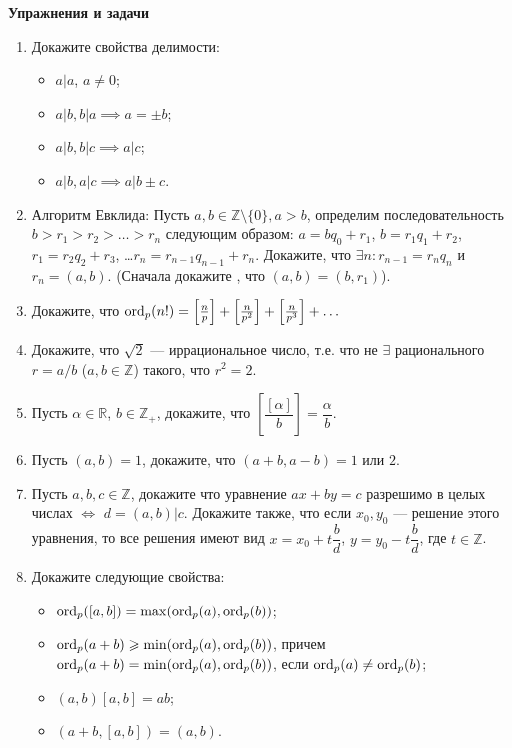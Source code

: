 \noindent\textbf{Упражнения и задачи}

\begin{enumerate}[topsep=0pt]
    \item Докажите свойства делимости: 
    \begin{itemize}[noitemsep,topsep=0pt]
        \item $a | a$, $a \neq 0$;
        \item $a|b, b|a \implies a=\pm b$;
        \item $a|b, b|c \implies a|c$;
        \item $a|b, a|c \implies a| b\pm c$.
    \end{itemize}
    \item Алгоритм Евклида: Пусть $a,b \in\mathbb{Z} \setminus \{0\}, a>b$, определим последовательность $b>r_1>r_2>\dots > r_n$ следующим образом: $a=bq_0+r_1$, $b=r_1q_1+r_2$, $r_1=r_2q_2+r_3$, \dots $r_n=r_{n-1} q_{n-1}+r_n$. Докажите, что $\exists n: r_{n-1}=r_nq_n$ и $r_n=(a,b)$. (Сначала докажите , что $(a,b)=(b,r_1)$).
    \item Докажите, что $\operatorname{ord}_p(n!)= \left[\frac{n}{p}\right] + \left[\frac{n}{p^2}\right] + \left[\frac{n}{p^3}\right] + \dots $
    \item Докажите, что $\sqrt{2}$ --- иррациональное число, т.е. что не $\exists$ рационального $r=a/b$ ($a,b \in \mathbb{Z}$) такого, что $r^2=2$.
    \item Пусть $\alpha \in \mathbb{R}$, $b\in\mathbb{Z}_+$, докажите, что $\left[\dfrac{[\alpha]}{b}\right]=\dfrac{\alpha}{b}$.
    \item Пусть $(a,b)=1$, докажите, что $(a+b,a-b)=1$ или $2$.
    \item Пусть $a,b,c \in \mathbb{Z}$, докажите что уравнение $ax+by=c$ разрешимо в целых числах $\iff$ $d=(a,b)|c$. Докажите также, что если $x_0,y_0$ --- решение этого уравнения, то все решения имеют вид $x=x_0+t\dfrac{b}{d}$, $y=y_0-t\dfrac{b}{d}$, где  $t \in \mathbb{Z}$.
    \item Докажите следующие свойства:
    \begin{itemize}[noitemsep,topsep=0pt]
        \item $\operatorname{ord}_p([a,b])=\max(\operatorname{ord}_p(a),\operatorname{ord}_p(b))$;
        \item $\operatorname{ord}_p(a+b)\geqslant \min(\operatorname{ord}_p(a),\operatorname{ord}_p(b))$, причем $\operatorname{ord}_p(a+b)= \min(\operatorname{ord}_p(a),\operatorname{ord}_p(b))$, если $\operatorname{ord}_p(a) \neq \operatorname{ord}_p(b)$;
        \item $(a,b)[a,b]=ab$;
        \item $(a+b,[a,b])=(a,b)$.
    \end{itemize}

\end{enumerate}
